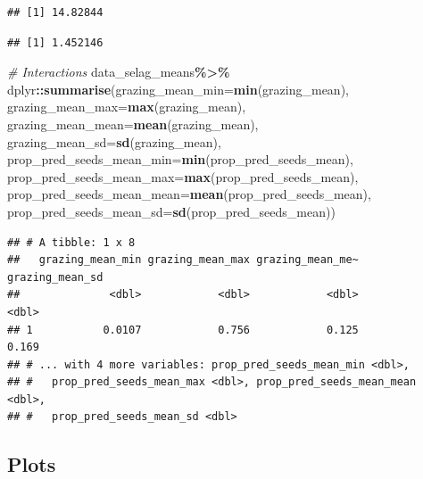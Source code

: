\documentclass[
]{article}
\newenvironment{Shaded}{\begin{snugshade}}{\end{snugshade}}
\newcommand{\CommentTok}[1]{\textcolor[rgb]{0.56,0.35,0.01}{\textit{#1}}}
\newcommand{\DataTypeTok}[1]{\textcolor[rgb]{0.13,0.29,0.53}{#1}}
\newcommand{\DecValTok}[1]{\textcolor[rgb]{0.00,0.00,0.81}{#1}}
\newcommand{\KeywordTok}[1]{\textcolor[rgb]{0.13,0.29,0.53}{\textbf{#1}}}
\newcommand{\NormalTok}[1]{#1}
\newcommand{\OperatorTok}[1]{\textcolor[rgb]{0.81,0.36,0.00}{\textbf{#1}}}
\newcommand{\StringTok}[1]{\textcolor[rgb]{0.31,0.60,0.02}{#1}}
\begin{document}
\begin{verbatim}
## [1] 14.82844
\end{verbatim}

\begin{Shaded}
\end{Shaded}

\begin{verbatim}
## [1] 1.452146
\end{verbatim}

\begin{Shaded}
\begin{Highlighting}[]
\CommentTok{\# Interactions}
\NormalTok{data\_selag\_means}\OperatorTok{\%\textgreater{}\%}
\StringTok{  }\NormalTok{dplyr}\OperatorTok{::}\KeywordTok{summarise}\NormalTok{(}\DataTypeTok{grazing\_mean\_min=}\KeywordTok{min}\NormalTok{(grazing\_mean),}
                   \DataTypeTok{grazing\_mean\_max=}\KeywordTok{max}\NormalTok{(grazing\_mean),}
                   \DataTypeTok{grazing\_mean\_mean=}\KeywordTok{mean}\NormalTok{(grazing\_mean),}
                   \DataTypeTok{grazing\_mean\_sd=}\KeywordTok{sd}\NormalTok{(grazing\_mean),}
                   \DataTypeTok{prop\_pred\_seeds\_mean\_min=}\KeywordTok{min}\NormalTok{(prop\_pred\_seeds\_mean),}
                   \DataTypeTok{prop\_pred\_seeds\_mean\_max=}\KeywordTok{max}\NormalTok{(prop\_pred\_seeds\_mean),}
                   \DataTypeTok{prop\_pred\_seeds\_mean\_mean=}\KeywordTok{mean}\NormalTok{(prop\_pred\_seeds\_mean),}
                   \DataTypeTok{prop\_pred\_seeds\_mean\_sd=}\KeywordTok{sd}\NormalTok{(prop\_pred\_seeds\_mean))}
\end{Highlighting}
\end{Shaded}

\begin{verbatim}
## # A tibble: 1 x 8
##   grazing_mean_min grazing_mean_max grazing_mean_me~ grazing_mean_sd
##              <dbl>            <dbl>            <dbl>           <dbl>
## 1           0.0107            0.756            0.125           0.169
## # ... with 4 more variables: prop_pred_seeds_mean_min <dbl>,
## #   prop_pred_seeds_mean_max <dbl>, prop_pred_seeds_mean_mean <dbl>,
## #   prop_pred_seeds_mean_sd <dbl>
\end{verbatim}

\hypertarget{plots}{%
\subsection{Plots}\label{plots}}
\end{document}
